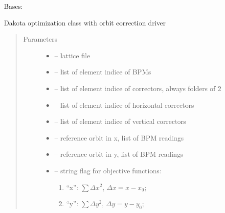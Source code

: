 \documentclass[letterpaper,10pt,english]{sphinxmanual}
\begin{document}

\begin{fulllineitems}
\label{\detokenize{src/apidocs/dakopt:genopt.dakopt.DakotaOC}}
Bases: {\hyperref[\detokenize{src/apidocs/dakopt:genopt.dakopt.DakotaBase}]{}}

Dakota optimization class with orbit correction driver
\begin{quote}\begin{description}
\item[{Parameters}] \leavevmode\begin{itemize}
\item {} 
 -- lattice file

\item {} 
 -- list of element indice of BPMs

\item {} 
 -- list of element indice of correctors, always folders of 2

\item {} 
 -- list of element indice of horizontal correctors

\item {} 
 -- list of element indice of vertical correctors

\item {} 
 -- reference orbit in x, list of BPM readings

\item {} 
 -- reference orbit in y, list of BPM readings

\item {} 
 -- 
string flag for objective functions:
\begin{enumerate}
\item {} 
``x'': \(\sum \Delta x^2\), \(\Delta x = x-x_0\);

\item {} 
``y'': \(\sum \Delta y^2\), \(\Delta y = y-y_0\);


\end{enumerate}
\end{itemize}
\end{description}
\end{quote}
\end{fulllineitems}
\end{document}
